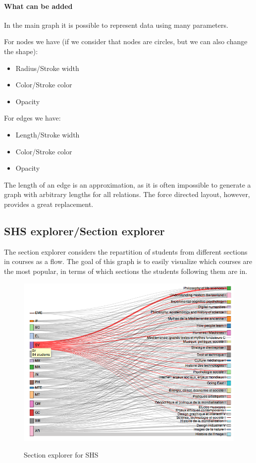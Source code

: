 \paragraph{What can be added}
In the main graph it is possible to represent data using many parameters. 

For nodes we have (if we consider that nodes are circles, but we can also change the shape):
\begin{itemize}
\item Radius/Stroke width
\item Color/Stroke color
\item Opacity
\end{itemize}

For edges we have: 
\begin{itemize}
\item Length/Stroke width
\item Color/Stroke color
\item Opacity
\end{itemize}

The length of an edge is an approximation, as it is often impossible to generate a graph with arbitrary lengths for all relations. The force directed layout, however, provides a great replacement. 

\subsection{SHS explorer/Section explorer}
The section explorer considers the repartition of students from different sections in courses as a flow. The goal of this graph is to easily visualize which  courses are the most popular,  in terms of which sections the students following them are in.

\begin{figure}[H]
\centering
\includegraphics[width=\textwidth]{images/view_shs_SV}
\label{fig:global}
\caption{Section explorer for SHS}
\end{figure}

